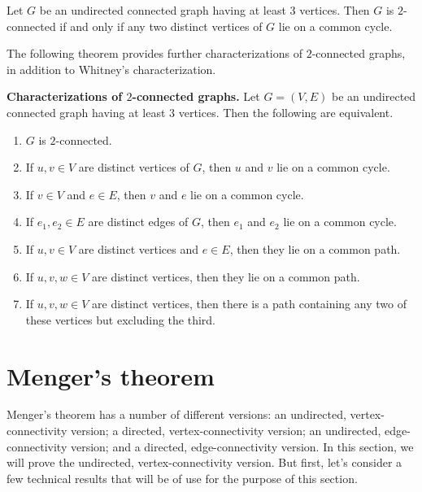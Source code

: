 \begin{corollary}
Let $G$ be an undirected connected graph having at least $3$
vertices. Then $G$ is $2$-connected if and only if any two distinct
vertices of $G$ lie on a common cycle.
\end{corollary}

The following theorem provides further characterizations of
$2$-connected graphs, in addition to Whitney's characterization.

\begin{theorem}
\label{thm:distance_connectivity:characterization_2_connected_graphs}
\textbf{Characterizations of $2$-connected graphs.}
Let $G = (V,E)$ be an undirected connected graph having at least $3$
vertices. Then the following are equivalent.
\begin{enumerate}
\item $G$ is $2$-connected.

\item If $u,v \in V$ are distinct vertices of $G$, then $u$ and $v$
  lie on a common cycle.

\item If $v \in V$ and $e \in E$, then $v$ and $e$ lie on a common
  cycle.

\item If $e_1, e_2 \in E$ are distinct edges of $G$, then $e_1$ and
  $e_2$ lie on a common cycle.

\item If $u,v \in V$ are distinct vertices and $e \in E$, then they
  lie on a common path.

\item If $u,v,w \in V$ are distinct vertices, then they lie on a
  common path.

\item If $u,v,w \in V$ are distinct vertices, then there is a path
  containing any two of these vertices but excluding the third.
\end{enumerate}
\end{theorem}





\section{Menger's theorem}

Menger's theorem has a number of different versions: an undirected,
vertex-connectivity version; a directed, vertex-connectivity version;
an undirected, edge-connectivity version; and a directed,
edge-connectivity version. In this section, we will prove the
undirected, vertex-connectivity version. But first, let's consider a
few technical results that will be of use for the purpose of this
section.

